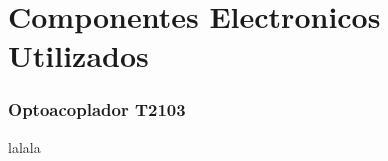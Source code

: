 \section{Componentes Electronicos Utilizados} %
\label{sec:componentes_electronicos_utilizados}


\subsubsection{Optoacoplador T2103} %
\label{ssub:optoacoplador_t2103}


lalala



\clearpage

